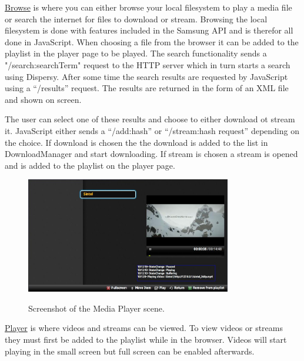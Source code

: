 \hyperref[fig:browse]{Browse} is where you can either browse your local filesystem to play a media file or search the internet for files to download or stream. Browsing the local filesystem is done with features included in the Samsung API and is therefor all done in JavaScript. When choosing a file from the browser it can be added to the playlist in the player page to be played. The search functionality sends a "/search:searchTerm" request to the HTTP server which in turn starts a search using Dispersy. After some time the search results are requested by JavaScript using a ``/results'' request. The results are returned in the form of an XML file and shown on screen. 

The user can select one of these results and choose to either download ot stream it. JavaScript either sends a ``/add:hash'' or ``/stream:hash request'' depending on the choice. If download is chosen the the download is added to the list in DownloadManager and start downloading. If stream is chosen a stream is opened and is added to the playlist on the player page.

\begin{center}
\begin{figure}[h]
	\centering
	\mbox{\includegraphics[width=0.8\textwidth]{Images/PlayerScene.jpg}}
	\label{fig:player}
	\caption{Screenshot of the Media Player scene.}
\end{figure}
\end{center}

\hyperref[fig:player]{Player} is where videos and streams can be viewed. To view videos or streams they must first be added to the playlist while in the browser. Videos will start playing in the small screen but full screen can be enabled afterwards.

